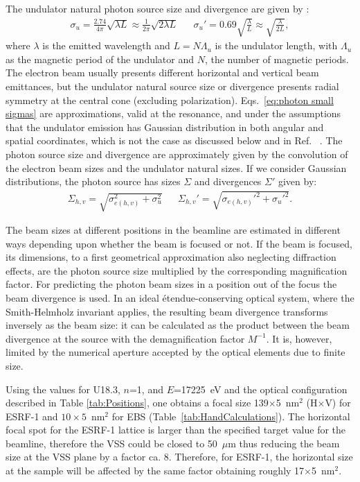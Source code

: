 \documentclass{iucr}              %
\newcommand{\inred}[1]{{\color{black}#1}}
\begin{document}
The undulator natural photon source size and divergence are given by \cite{elleaume}:
\begin{align}
    \label{eq:photon small sigmas}
    \sigma_u=\frac{2.74}{4\pi}\sqrt{\lambda L}\approx \frac{1}{2  \pi}\sqrt{2 \lambda L}  && \sigma_u' = 0.69\sqrt{\frac{\lambda}{L}}\approx \sqrt{\frac{\lambda}{2 L}},
\end{align}
where $\lambda$ is the emitted wavelength and $L=N\Lambda_u$ is the undulator length, with $\Lambda_u$ as the magnetic period of the undulator and $N$, the number of magnetic periods. The electron beam usually presents different horizontal and vertical beam emittances, but the undulator natural source size or divergence presents radial symmetry at the central cone (excluding polarization).  \inred{Eqs.~\ref{eq:photon small sigmas} are approximations, valid at the resonance, and under the assumptions that the undulator emission has Gaussian distribution in both angular and spatial coordinates, which is not the case as discussed below and in Ref.~\cite{arxivCF}} . The photon source size and divergence are approximately given by the convolution of the electron beam sizes and the undulator natural sizes. If we consider Gaussian distributions, the photon source has sizes $\Sigma$ and divergences $\Sigma'$ given by:
\begin{align}
\label{eq:photon big sigmas}
\Sigma_{h,v}=\sqrt{\sigma_{e(h,v)}^2 + \sigma_u^2} && \Sigma_{h,v}'=\sqrt{\sigma_{e(h,v)}'^2 + \sigma_u'^2}.
\end{align}

The beam sizes at different positions in the beamline are estimated in different ways depending upon whether the beam is focused or not. If the beam is focused, its dimensions, to a first \inred{geometrical} approximation \inred{also neglecting diffraction effects}, are the photon source size multiplied by the corresponding magnification factor. For predicting the photon beam sizes in a position out of the focus the beam divergence is used. In an ideal {\'{e}}tendue-conserving optical system, where the Smith-Helmholz invariant applies, the resulting beam divergence transforms inversely as the beam size: it can be calculated as the product between the beam divergence at the source with the demagnification factor $M^{-1}$. \inred{It is, however, limited by the numerical aperture accepted by the optical elements due to finite size.}

Using the values for U18.3, $n$=1, and  $E$=17225~eV and the optical configuration described in Table \ref{tab:Positions}, one obtains a focal size 139$\times$5~nm$^2$ (H$\times$V) for ESRF-1 and $10\times5$~nm$^2$ for EBS (Table~\ref{tab:HandCalculations}). The horizontal focal spot for the ESRF-1 lattice is larger than the specified target value for the beamline, therefore the VSS could be closed to 50~$\mu$m thus reducing the beam size at the VSS plane by a factor ca. 8.
Therefore, for ESRF-1, the horizontal size at the sample will be affected by the same factor obtaining roughly 17$\times$5~nm$^2$.
\end{document}
